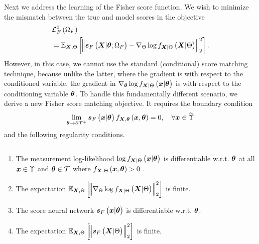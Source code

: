
Next we address the learning of the Fisher score function. We wish to minimize the mismatch between the true and model scores in the objective
{
\begin{align}
        &\lossfs\brackets{\paramf}\nonumber\\
        &=\expectation{\norm{\lscore{{\X}}{\p;\paramf}-\nabla_{\pr}\log\probt{{\X}|\pr}{{\X}|\pr}}_2^2}{{\X},\pr}.
\end{align}
}
However, in this case, we cannot use the standard {(conditional)} score matching {technique, because unlike the latter, where the gradient is with respect to the conditioned variable, the gradient in }
{$\nabla_{\p}\log\probt{{\x}|\p}{{\X}|\pr}$} {is with respect to the conditioning variable $\bm{\theta}$.} 
To {handle this fundamentally different scenario}, we 
{derive a new Fisher score matching objective. It requires the boundary condition \begin{equation}\label{eq:boundary_condtions_gen_direct}
    \lim\limits_{\p\rightarrow\Psb}  \lscore{{\x}}{\p}\probt{{\x},\p}{{\X},\p} =0,\quad \forall {\x}\in\widetilde{\Upsilon}
\end{equation} and the following regularity conditions.
}
\begin{assumption}\label{ass:score_reg}$\,$
    \begin{enumerate}[label=\text{\ref{ass:score_reg}}.\arabic*,labelsep=*, leftmargin=*]
    \item The %
    {measurement {log-likelihood}} %
    {$\log\probt{{\x}|\p}{{\X}|\pr}$} is differentiable w.r.t. $\bm{\theta}$ {at all $\bm{x}\in\Upsilon$ and $\bm{\theta}\in\mathcal{T}$  where $\probt{{\x},\p}{{\X},\pr} > 0$} \label{assum:diff_prob}. 

    \item\label{ass:bound_expection} The expectation %
    {$\expectation{\norm{\nabla_{\pr}\log\probt{{\X}|\pr}{{\X}|\pr}}_2^2}{{\X},\pr}$} is finite. 
    \item The score neural network %
    {$\bm{s}_{F}\left({\bm{x}}|\bm{\theta}\right)$} is differentiable w.r.t. $\bm{\theta}$. \label{assum:diff_net} 
    \item\label{ass:bound_expection_v2} The expectation   %
    {$\expectation{\norm{\lscore{{\X}}{\pr}}_2^2}{{\X},\pr}$} is finite. 
\end{enumerate}
\end{assumption}

